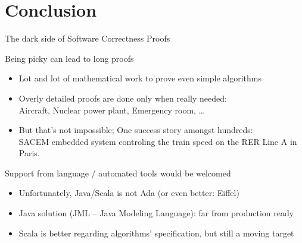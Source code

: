 \section{Conclusion}\sectionpage
\begin{frame}{The dark side of Software Correctness Proofs}
  \begin{block}{Being picky can lead to long proofs}
    \begin{itemize}
    \item Lot and lot of mathematical work to prove even simple algorithms
    \item Overly detailed proofs are done only when really needed: \\
      {\small Aircraft, Nuclear power plant, Emergency room, \ldots}
    \item But that's not impossible; One success story amongst hundreds:\\
      {\small SACEM embedded system controling the train speed on
        the RER Line A in Paris.} 
    \end{itemize}
  \end{block}
  \begin{block}{Support from language / automated tools would be welcomed}
    \begin{itemize}
    \item Unfortunately, Java/Scala is not Ada (or even better: Eiffel)
    \item Java solution (JML -- Java Modeling Language): far from production
      ready
    \item Scala is better regarding algorithms' specification, but still a
      moving target
    \end{itemize}
  \end{block}
\end{frame}

